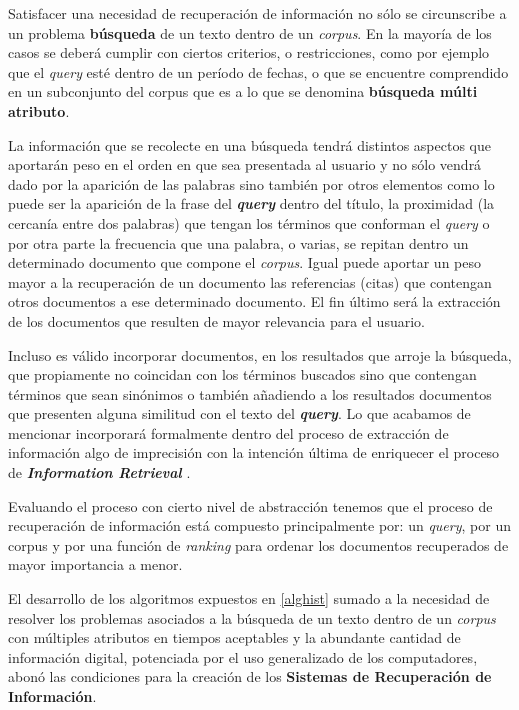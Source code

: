 \documentclass[
  10,
  spanish,
  openany]{book}
\begin{document}
Satisfacer una necesidad de recuperación de información no sólo se circunscribe a un problema \textbf{búsqueda} de un texto dentro de un \emph{corpus}. En la mayoría de los casos se deberá cumplir con ciertos criterios, o restricciones, como por ejemplo que el \emph{query} esté dentro de un período de fechas, o que se encuentre comprendido en un subconjunto del corpus que es a lo que se denomina \textbf{búsqueda múlti atributo}.

La información que se recolecte en una búsqueda tendrá distintos aspectos que aportarán peso en el orden en que sea presentada al usuario y no sólo vendrá dado por la aparición de las palabras sino también por otros elementos como lo puede ser la aparición de la frase del \textbf{\emph{query}} dentro del título, la proximidad (la cercanía entre dos palabras) que tengan los términos que conforman el \emph{query} o por otra parte la frecuencia que una palabra, o varias, se repitan dentro un determinado documento que compone el \emph{corpus}. Igual puede aportar un peso mayor a la recuperación de un documento las referencias (citas) que contengan otros documentos a ese determinado documento. El fin último será la extracción de los documentos que resulten de mayor relevancia para el usuario.

Incluso es válido incorporar documentos, en los resultados que arroje la búsqueda, que propiamente no coincidan con los términos buscados sino que contengan términos que sean sinónimos o también añadiendo a los resultados documentos que presenten alguna similitud con el texto del \textbf{\emph{query}}. Lo que acabamos de mencionar incorporará formalmente dentro del proceso de extracción de información algo de imprecisión con la intención última de enriquecer el proceso de \textbf{\emph{Information Retrieval}} \citep{kraft2017}.

Evaluando el proceso con cierto nivel de abstracción tenemos que el proceso de recuperación de información está compuesto principalmente por: un \emph{query}, por un corpus y por una función de \emph{ranking} para ordenar los documentos recuperados de mayor importancia a menor.

El desarrollo de los algoritmos expuestos en \ref{alghist} sumado a la necesidad de resolver los problemas asociados a la búsqueda de un texto dentro de un \emph{corpus} con múltiples atributos en tiempos aceptables y la abundante cantidad de información digital, potenciada por el uso generalizado de los computadores, abonó las condiciones para la creación de los \textbf{Sistemas de Recuperación de Información}.
\end{document}

